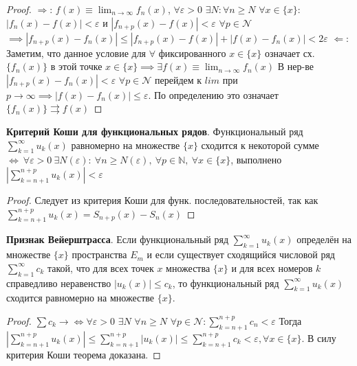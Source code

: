 \begin{proof}
$\Rightarrow$: $f(x) \equiv \lim_{n \rightarrow \infty} f_n(x)$, $\forall \varepsilon > 0$ $\exists N: \forall n \geq N$ $\forall x \in \{x\}$: \newline 
$|f_n(x) - f(x)| < \varepsilon$ и $|f_{n+p}(x) - f(x)| < \varepsilon $ $ \forall p \in \mathcal{N}$ $\implies |f_{n+p}(x) - f_n(x)| \leq |f_{n+p}(x) - f(x)| + |f(x) - f_n(x)| < 2 \varepsilon$ \newline
$\Leftarrow$: Заметим, что данное условие для $\forall$ фиксированного $x \in \{x\}$ означает сх. $\{f_n(x)\}$ в этой точке $x \in \{x\} \implies \exists f(x) \equiv \lim_{n \rightarrow \infty} f_n(x)$
В нер-ве $|f_{n+p}(x) - f_n(x)| < \varepsilon$ $\forall p \in \mathcal{N}$ перейдем к $lim$ при $p \rightarrow \infty \implies |f(x) - f_n(x)| \leq \varepsilon$. По определению это означает $\{f_n(x)\} \rightrightarrows f(x)$
\end{proof}

\bigbreak 
\textbf{Критерий Коши для функциональных рядов}. Функциональный ряд 
$\displaystyle \sum_{k=1}^{\infty} u_k(x)$ равномерно на множестве $\{x\}$ сходится к некоторой сумме 
$\iff ~ \forall \varepsilon > 0 ~ \exists N(\varepsilon): ~ \forall n \geqslant N(\varepsilon), ~ \forall p \in \mathbb{N}, ~ \forall x \in \{x\}$, выполнено
$\left|\sum_{k=n+1}^{n+p} u_k(x)\right| < \varepsilon$
\begin{proof}
Следует из критерия Коши для функ. последовательностей, так как $\sum^{n+p}_{k=n+1} u_k(x)=S_{n+p}(x)-S_n(x)$
\end{proof}


\bigbreak 
\textbf{Признак Вейерштрасса}. Если функциональный ряд $\displaystyle \sum_{k=1}^{\infty} u_k(x)$ определён на множестве $\{x\}$ пространства $E_m$ и если существует сходящийся числовой ряд $\displaystyle \sum_{k=1}^{\infty} c_k$ такой, что для всех точек $x$ множества $\{x\}$ и для всех номеров $k$ справедливо неравенство $|u_k(x)| \leqslant c_k$, то функциональный ряд $\displaystyle \sum_{k=1}^{\infty} u_k(x)$ сходится равномерно на множестве $\{x\}$.

\begin{proof}
$\sum c_k \to \Leftrightarrow \forall \varepsilon > 0$ $\exists N$ $\forall n \geq N$ $\forall p \in \mathcal{N}: \sum_{k = n + 1}^{n + p} c_n < \varepsilon$ \newline
Тогда $\left|\sum_{k = n + 1}^{n + p}u_k(x)\right| \leq \sum_{k = n + 1}^{n+p}|u_k(x)| \leq \sum_{k = n + 1}^{n+p}c_k < \varepsilon, \forall x \in \{x\}$. В силу критерия Коши теорема доказана.
\end{proof}

